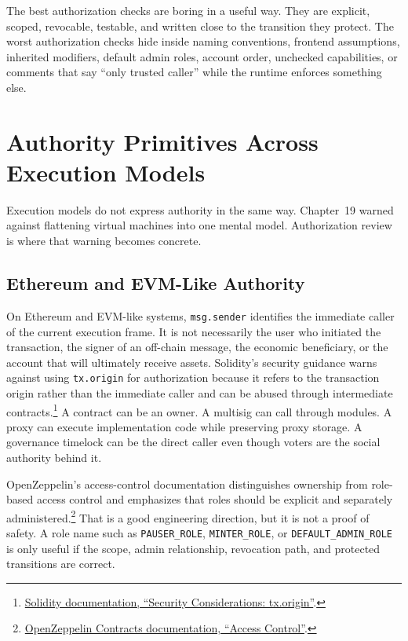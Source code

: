 The best authorization checks are boring in a useful way. They are explicit, scoped, revocable, testable, and written close to the transition they protect. The worst authorization checks hide inside naming conventions, frontend assumptions, inherited modifiers, default admin roles, account order, unchecked capabilities, or comments that say ``only trusted caller'' while the runtime enforces something else.

\section{Authority Primitives Across Execution Models}

Execution models do not express authority in the same way. Chapter~19 warned against flattening virtual machines into one mental model. Authorization review is where that warning becomes concrete.

\subsection{Ethereum and EVM-Like Authority}

On Ethereum and EVM-like systems, \texttt{msg.sender} identifies the immediate caller of the current execution frame. It is not necessarily the user who initiated the transaction, the signer of an off-chain message, the economic beneficiary, or the account that will ultimately receive assets. Solidity's security guidance warns against using \texttt{tx.origin} for authorization because it refers to the transaction origin rather than the immediate caller and can be abused through intermediate contracts.\footnote{\href{https://docs.soliditylang.org/en/latest/security-considerations.html\#tx-origin}{Solidity documentation, ``Security Considerations: tx.origin''}.} A contract can be an owner. A multisig can call through modules. A proxy can execute implementation code while preserving proxy storage. A governance timelock can be the direct caller even though voters are the social authority behind it.

OpenZeppelin's access-control documentation distinguishes ownership from role-based access control and emphasizes that roles should be explicit and separately administered.\footnote{\href{https://docs.openzeppelin.com/contracts/5.x/access-control}{OpenZeppelin Contracts documentation, ``Access Control''}.} That is a good engineering direction, but it is not a proof of safety. A role name such as \texttt{PAUSER\_ROLE}, \texttt{MINTER\_ROLE}, or \texttt{DEFAULT\_ADMIN\_ROLE} is only useful if the scope, admin relationship, revocation path, and protected transitions are correct.

